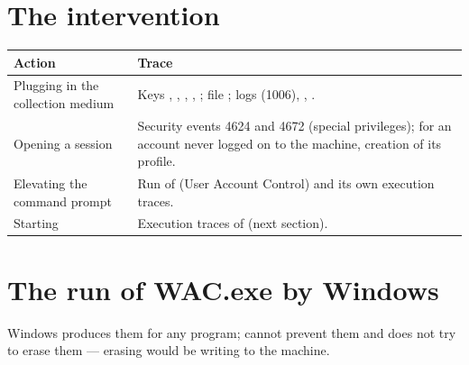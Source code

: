 \documentclass[11pt,a4paper,oneside]{report}
\begin{document}
\section{The intervention}

\begin{longtable}{@{}L{4.3cm}L{10.1cm}@{}}
\toprule
\bfseries Action & \bfseries Trace \\
\midrule
\endhead
Plugging in the collection medium & Keys , ,
  , ,
  ; file ; logs
   (1006),
  , . \\
Opening a session & Security events 4624 and 4672 (special privileges); for
  an account never logged on to the machine, creation of its profile. \\
Elevating the command prompt & Run of  (User Account
  Control) and its own execution traces. \\
Starting  & Execution traces of  (next
  section). \\
\bottomrule
\end{longtable}

\section{The run of WAC.exe by Windows}

Windows produces them for any program; \wac{} cannot prevent them and does
not try to erase them — erasing would be writing to the machine.
\end{document}
